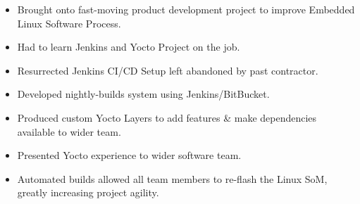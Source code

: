 
{
  {\begin{itemize}
    \item Brought onto fast-moving product development project to improve Embedded Linux Software Process.
    \item Had to learn Jenkins and Yocto Project on the job. 
    \item Resurrected Jenkins CI/CD Setup left abandoned by past contractor. 
    \item Developed nightly-builds system using Jenkins/BitBucket.
    \item Produced custom Yocto Layers to add features \& make dependencies available to wider team. 
    \item Presented Yocto experience to wider software team. 
    \item Automated builds allowed all team members to re-flash the Linux SoM, greatly increasing project agility. 
  \end{itemize} 
  }
}

